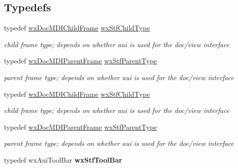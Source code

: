 \subsection*{Typedefs}
\begin{DoxyCompactItemize}
\item 
\hypertarget{group__wxstf_gaca090027a7eceae4189b1a4e2747a921}{
typedef \hyperlink{classwxDocMDIChildFrame}{wxDocMDIChildFrame} \hyperlink{group__wxstf_gaca090027a7eceae4189b1a4e2747a921}{wxStfChildType}}
\label{group__wxstf_gaca090027a7eceae4189b1a4e2747a921}

\begin{DoxyCompactList}\small\item\em child frame type; depends on whether aui is used for the doc/view interface \item\end{DoxyCompactList}\item 
\hypertarget{group__wxstf_gac69111a30c99cf6bf4a9b2ae1cf6348b}{
typedef \hyperlink{classwxDocMDIParentFrame}{wxDocMDIParentFrame} \hyperlink{group__wxstf_gac69111a30c99cf6bf4a9b2ae1cf6348b}{wxStfParentType}}
\label{group__wxstf_gac69111a30c99cf6bf4a9b2ae1cf6348b}

\begin{DoxyCompactList}\small\item\em parent frame type; depends on whether aui is used for the doc/view interface \item\end{DoxyCompactList}\item 
\hypertarget{group__wxstf_gaca090027a7eceae4189b1a4e2747a921}{
typedef \hyperlink{classwxDocMDIChildFrame}{wxDocMDIChildFrame} \hyperlink{group__wxstf_gaca090027a7eceae4189b1a4e2747a921}{wxStfChildType}}
\label{group__wxstf_gaca090027a7eceae4189b1a4e2747a921}

\begin{DoxyCompactList}\small\item\em child frame type; depends on whether aui is used for the doc/view interface \item\end{DoxyCompactList}\item 
\hypertarget{group__wxstf_gac69111a30c99cf6bf4a9b2ae1cf6348b}{
typedef \hyperlink{classwxDocMDIParentFrame}{wxDocMDIParentFrame} \hyperlink{group__wxstf_gac69111a30c99cf6bf4a9b2ae1cf6348b}{wxStfParentType}}
\label{group__wxstf_gac69111a30c99cf6bf4a9b2ae1cf6348b}

\begin{DoxyCompactList}\small\item\em parent frame type; depends on whether aui is used for the doc/view interface \item\end{DoxyCompactList}\item 
\hypertarget{group__wxstf_ga5091357e98d0ee6aa790dd6c902c6c10}{
typedef wxAuiToolBar {\bfseries wxStfToolBar}}
\label{group__wxstf_ga5091357e98d0ee6aa790dd6c902c6c10}

\end{DoxyCompactItemize}
